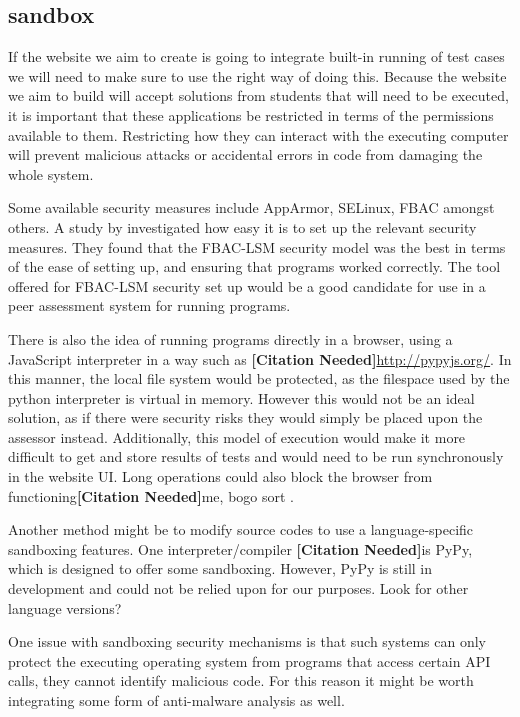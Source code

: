\documentclass[a4paper,11pt]{report}
\newcommand{\cn}{\textbf{[Citation Needed]}}
\begin{document}
\subsection{sandbox}
If the website we aim to create is going to integrate built-in running of test cases we will need to make sure to use the right way of doing this. Because the website we aim to build will accept solutions from students that will need to be executed, it is important that these applications be restricted in terms of the permissions available to them. Restricting how they can interact with the executing computer will prevent malicious attacks or accidental errors in code from damaging the whole system.\par
Some available security measures include AppArmor, SELinux, FBAC amongst others. A study by \cite{schreuders_empowering_2011} investigated how easy it is to set up the relevant security measures. They found that the FBAC-LSM security model was the best in terms of the ease of setting up, and ensuring that programs worked correctly. The tool offered for FBAC-LSM security set up would be a good candidate for use in a peer assessment system for running programs.\par
There is also the idea of running programs directly in a browser, using a JavaScript interpreter in a way such as \cn \url{http://pypyjs.org/}. In this manner, the local file system would be protected, as the filespace used by the python interpreter is virtual in memory. However this would not be an ideal solution, as if there were security risks they would simply be placed upon the assessor instead. Additionally, this model of execution would make it more difficult to get and store results of tests and would need to be run synchronously in the website UI. Long operations could also block the browser from functioning\cn {me, bogo sort} .\par
Another method might be to modify source codes to use a language-specific sandboxing features. One interpreter/compiler \cn is PyPy, which is designed to offer some sandboxing. However, PyPy is still in development and could not be relied upon for our purposes. Look for other language versions?\par
One issue with sandboxing security mechanisms is that such systems can only protect the executing operating system from programs that access certain API calls, they cannot identify malicious code. For this reason it might be worth integrating some form of anti-malware analysis as well.\par
\end{document}
